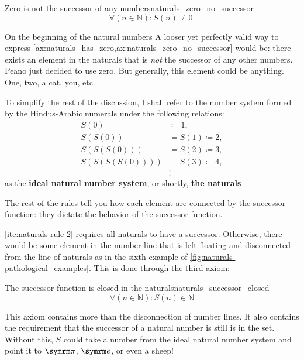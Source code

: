 \begin{axiom}{Zero is not the successor of any numbers}{naturals_zero_no_successor}
  \begin{equation*}
    \forall (n \in \mathbb{N}): S(n) \neq 0.
  \end{equation*}
\end{axiom}

\begin{remark}{On the beginning of the natural numbers}{}
  A looser yet perfectly valid way to express
  \cref{ax:naturals_has_zero,ax:naturals_zero_no_successor} would be: there exists an element in the
  naturals that is \emph{not} the successor of any other numbers. Peano just decided to use zero.
  But generally, this element could be anything. One, two, a cat, you, etc.
\end{remark}

To simplify the rest of the discussion, I shall refer to the number system formed by the
Hindus-Arabic numerals under the following relations:
\begin{equation}
  \begin{aligned}
    S(0)          & \coloneqq 1,        \\
    S(S(0))       & = S(1) \coloneqq 2, \\
    S(S(S(0)))    & = S(2) \coloneqq 3, \\
    S(S(S(S(0)))) & = S(3) \coloneqq 4, \\
                  & \vdots
  \end{aligned}
  \label{eq:naturals_chain}
\end{equation}
as the \textbf{ideal natural number system}, or shortly, \textbf{the naturals}

The rest of the rules tell you how each element are connected by the successor function: they
dictate the behavior of the successor function.

\ref{ite:naturals-rule-2} requires all naturals to have a successor. Otherwise, there would be some
element in the number line that is left floating and disconnected from the line of naturals as in
the sixth example of \cref{fig:naturals-pathological_examples}. This is done through the third
axiom:
\begin{axiom}{The successor function is closed in the naturals}{naturals_successor_closed}
  \begin{equation*}
    \forall (n \in \mathbb{N}) : S(n) \in \mathbb{N}
  \end{equation*}
\end{axiom}
This axiom contains more than the disconnection of number lines. It also contains the requirement
that the successor of a natural number is still is in the set. Without this, \(S\) could take a
number from the ideal natural number system and point it to \(\cpi\), \(\e\), or even a sheep!

